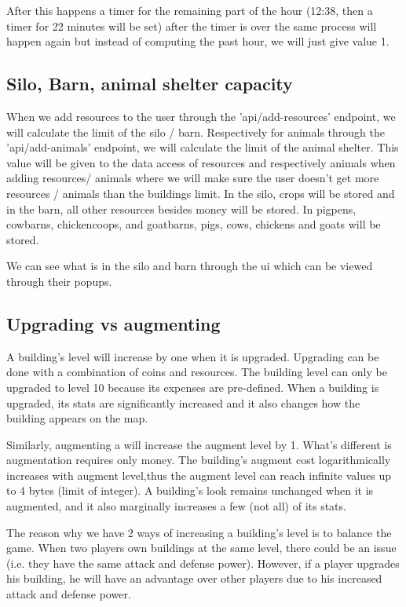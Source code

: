 \documentclass[12pt]{article}
\begin{document}
After this happens a timer for the remaining part of the hour (12:38, then a timer for 22 minutes will be set) after the timer is over the same process will happen again but instead of computing the past hour, we will just give value 1.

\subsection{Silo, Barn, animal shelter capacity}
When we add resources to the user through the 'api/add-resources' endpoint, we will calculate the limit of the silo / barn.
Respectively for animals through the 'api/add-animals' endpoint, we will calculate the limit of the animal shelter.
This value will be given to the data access of resources and respectively animals when adding resources/ animals where we will make sure the user doesn't get more resources / animals than the buildings limit.
In the silo, crops will be stored and in the barn, all other resources besides money will be stored.
In pigpens, cowbarns, chickencoops, and goatbarns, pigs, cows, chickens and goats will be stored.

We can see what is in the silo and barn through the ui which can be viewed through their popups.
\subsection{Upgrading vs augmenting}
A building's level will increase by one when it is upgraded.
Upgrading can be done with a combination of coins and resources.
The building level can only be upgraded to level 10 because its expenses are pre-defined.
When a building is upgraded, its stats are significantly increased and it also changes how the building appears on the map.


Similarly, augmenting a will increase the augment level by 1.
What's different is augmentation requires only money.
The building's augment cost logarithmically increases with augment level,thus the augment level can reach infinite values up to 4 bytes (limit of integer).
A building's look remains unchanged when it is augmented, and it also marginally increases a few (not all) of its stats.

The reason why we have 2 ways of increasing a building's level is to balance the game.
When two players own buildings at the same level, there could be an issue (i.e. they have the same attack and defense power).
However, if a player upgrades his building, he will have an advantage over other players due to his increased attack and defense power.
\end{document}
